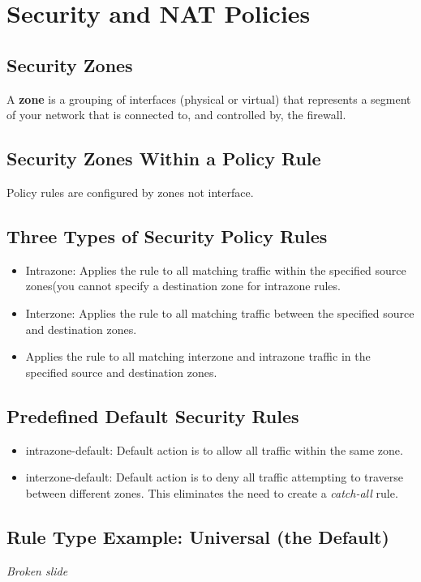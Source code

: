 \section{Security and NAT Policies}
\subsection{Security Zones}
A \textbf{zone} is a grouping of interfaces (physical or virtual) that represents a segment of your network that is connected to, and controlled by, the firewall.

\subsection{Security Zones Within a Policy Rule}
Policy rules are configured by zones not interface.

\subsection{Three Types of Security Policy Rules}
    \begin{itemize}
        \item Intrazone:  Applies the rule to all matching traffic within the specified source zones(you cannot specify a destination zone for intrazone rules.
        \item Interzone:  Applies the rule to all matching traffic between the specified source and destination zones.
        \item Applies the rule to all matching interzone and intrazone traffic in the specified source and destination zones.
    \end{itemize}

\subsection{Predefined Default Security Rules}
    \begin{itemize}
        \item intrazone-default:  Default action is to allow all traffic within the same zone.
        \item interzone-default:  Default action is to deny all traffic attempting to traverse between different zones. This eliminates the need to create a \textit{catch-all} rule.
    \end{itemize}

\subsection{Rule Type Example:  Universal (the Default)}
\textit{Broken slide}

